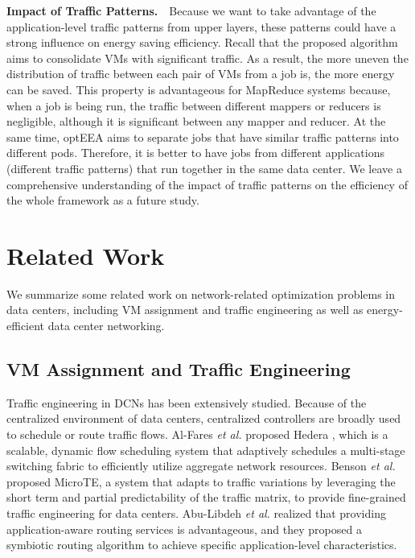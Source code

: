 \documentclass[journal,single-space,two column,twoside,10pt]{IEEEtran}
\begin{document}
\textbf{Impact of Traffic Patterns.}~~Because we want to take advantage of the application-level traffic patterns from upper layers, these patterns could have a strong influence on energy saving efficiency. Recall that the proposed algorithm aims to consolidate VMs with significant traffic. As a result, the more uneven the distribution of traffic between each pair of VMs from a job is, the more energy can be saved. This property is advantageous for MapReduce systems because, when a job is being run, the traffic between different mappers or reducers is negligible, although it is significant between any mapper and reducer. At the same time, optEEA aims to separate jobs that have similar traffic patterns into different pods. Therefore, it is better to have jobs from different applications (different traffic patterns) that run together in the same data center. We leave a comprehensive understanding of the impact of traffic patterns on the efficiency of the whole framework as a future study.


\section{Related Work}
\label{sec:related}

We summarize some related work on network-related optimization problems in data centers, including VM assignment and traffic engineering as well as energy-efficient data center networking.


\subsection{VM Assignment and Traffic Engineering}

Traffic engineering in DCNs has been extensively studied. Because of the centralized environment of data centers, centralized controllers are broadly used to schedule or route traffic flows. Al-Fares \emph{et al.} proposed Hedera \cite{AL-Fares_Radhakrishnan-2010}, which is a scalable, dynamic flow scheduling system that adaptively schedules a multi-stage switching fabric to efficiently utilize aggregate network resources. Benson \emph{et al.} \cite{Benson_Anand-2011} proposed MicroTE, a system that adapts to traffic variations by leveraging the short term and partial predictability of the traffic matrix, to provide fine-grained traffic engineering for data centers. Abu-Libdeh \emph{et al.} \cite{Abu-Libdeh_Costa-2010} realized that providing application-aware routing services is advantageous, and they proposed a symbiotic routing algorithm to achieve specific application-level characteristics.
\end{document}
